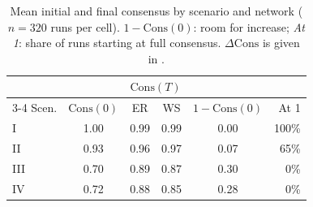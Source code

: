 \begin{table}[t]
\centering\small
\setlength{\tabcolsep}{4pt}
\begin{tabular}{@{}lccccr@{}}
\toprule
 & & \multicolumn{2}{c}{$\mathrm{Cons}(T)$} & & \\
\cmidrule(lr){3-4}
Scen. & $\mathrm{Cons}(0)$ & ER & WS & $1-\mathrm{Cons}(0)$ & At 1 \\
\midrule
I   & 1.00 & 0.99 & 0.99 & 0.00 & 100\% \\
II  & 0.93 & 0.96 & 0.97 & 0.07 & 65\% \\
III & 0.70 & 0.89 & 0.87 & 0.30 & 0\% \\
IV  & 0.72 & 0.88 & 0.85 & 0.28 & 0\% \\
\bottomrule
\end{tabular}
\caption{Mean initial and final consensus by scenario and network
($n=320$ runs per cell). $1-\mathrm{Cons}(0)$: room for increase;
\emph{At 1}: share of runs starting at full consensus.
$\Delta\mathrm{Cons}$ is given in .}
\label{tab:consensus-levels}
\end{table}